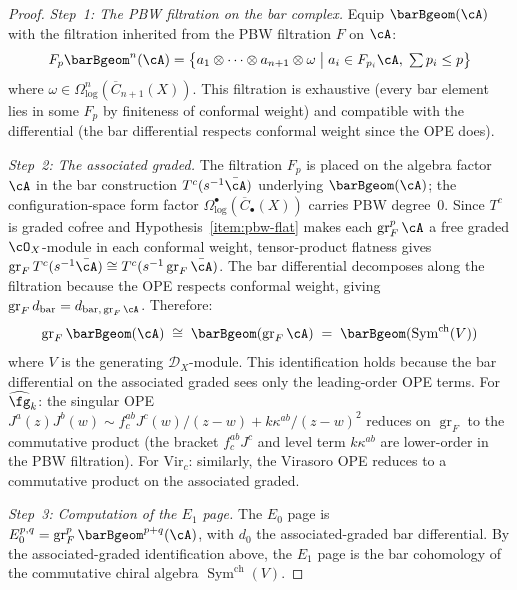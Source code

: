 \begin{proof}
\emph{Step~1: The PBW filtration on the bar complex.}
Equip $\barBgeom(\cA)$ with the filtration inherited from
the PBW filtration $F$ on $\cA$:
\[
F_p \barBgeom^n(\cA) = \bigl\{
a_1 \otimes \cdots \otimes a_{n+1} \otimes \omega
\;\big|\; a_i \in F_{p_i}\cA,\;
\textstyle\sum p_i \leq p\bigr\}
\]
where $\omega \in \Omega^n_{\log}(\overline{C}_{n+1}(X))$.
This filtration is exhaustive (every bar element lies in
some $F_p$ by finiteness of conformal weight) and
compatible with the differential (the bar differential
respects conformal weight since the OPE does).

\emph{Step~2: The associated graded.}
The filtration $F_p$ is placed on the algebra factor $\cA$ in the bar construction $T^c(s^{-1}\bar{\cA})$
underlying $\barBgeom(\cA)$; the configuration-space form factor
$\Omega^\bullet_{\log}(\overline{C}_\bullet(X))$ carries PBW degree~$0$.
Since $T^c$ is graded cofree and Hypothesis~\ref{item:pbw-flat} makes each
$\operatorname{gr}_F^p\cA$ a free graded $\cO_X$-module in each conformal weight,
tensor-product flatness gives
$\operatorname{gr}_F T^c(s^{-1}\bar{\cA}) \cong T^c(s^{-1}\operatorname{gr}_F\bar{\cA})$.
The bar differential decomposes along the filtration because the OPE respects
conformal weight, giving
$\operatorname{gr}_F d_{\mathrm{bar}} = d_{\mathrm{bar},\,\operatorname{gr}_F\cA}$.
Therefore:
  \begin{equation}
\operatorname{gr}_F \barBgeom(\cA) \;\cong\;
\barBgeom(\operatorname{gr}_F \cA)
\;=\; \barBgeom(\operatorname{Sym}^{\mathrm{ch}}(V))
\end{equation}
where $V$ is the generating $\mathcal{D}_X$-module.
This identification holds because the bar differential on the
associated graded sees only the leading-order OPE terms.
For $\widehat{\fg}_k$: the singular OPE
$J^a(z) J^b(w) \sim f^{ab}_c J^c(w)/(z-w)
+ k\kappa^{ab}/(z-w)^2$
reduces on $\operatorname{gr}_F$ to the commutative product
(the bracket $f^{ab}_c J^c$ and level term $k\kappa^{ab}$ are
lower-order in the PBW filtration).
For $\mathrm{Vir}_c$: similarly, the Virasoro OPE reduces to a
commutative product on the associated graded.

\emph{Step~3: Computation of the $E_1$ page.}
The $E_0$ page is
$E_0^{p,q} = \operatorname{gr}^p_F \barBgeom^{p+q}(\cA)$,
with $d_0$ the associated-graded bar differential.
By the associated-graded identification above, the $E_1$ page
is the bar cohomology of the commutative chiral algebra
$\operatorname{Sym}^{\mathrm{ch}}(V)$.


\end{proof}
